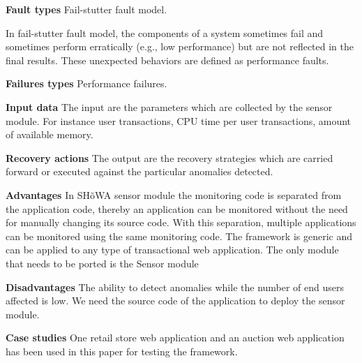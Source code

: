 \begin{compactitem}

\item[\textbf{Fault types}]Fail-stutter fault model. 

In fail-stutter fault model, the components of a system sometimes fail and sometimes perform erratically (e.g., low performance) but are not reflected in the final results. These unexpected behaviors are defined as performance faults.

\item[\textbf{Failures types}]Performance failures.

\item[\textbf{Input data}] The input are the parameters which are collected by the sensor module. For instance user transactions, CPU time per user transactions, amount of available memory.

\item[\textbf{Recovery actions}]The output are the recovery strategies which are carried forward or executed against the particular anomalies detected.

\item[\textbf{Advantages}] In SH\~oWA sensor module the monitoring code is separated from the application code, thereby an application can be monitored without the need for manually changing its source code. With this separation, multiple applications can be monitored using the same monitoring code. The framework is generic and can be applied to any type of transactional web application. The only module that needs to be ported is the Sensor module

\item[\textbf{Disadvantages}]The ability to detect anomalies while the number of end users affected is low.
We need the source code of the application to deploy the sensor module.

\item[\textbf{Case studies}]One retail store web application and an auction web application has been used in this paper for testing the framework.
\end{compactitem}


